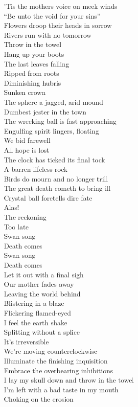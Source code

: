 'Tis the mothers voice on meek winds \\
``Be unto the void for your sins'' \\
Flowers droop their heads in sorrow \\
Rivers run with no tomorrow \\

Throw in the towel \\
Hang up your boots \\
The last leaves falling \\
Ripped from roots \\
Diminishing hubris \\
Sunken crown \\
The sphere a jagged, arid mound \\
Dumbest jester in the town \\
The wrecking ball is fast approaching \\
Engulfing spirit lingers, floating \\
We bid farewell \\
All hope is lost \\
The clock has ticked its final tock \\
A barren lifeless rock \\

Birds do mourn and no longer trill \\
The great death cometh to bring ill \\
Crystal ball foretells dire fate \\
Alas! \\
The reckoning \\
Too late \\

Swan song \\
Death comes \\
Swan song \\
Death comes \\

Let it out with a final sigh \\
Our mother fades away \\
Leaving the world behind \\
Blistering in a blaze \\
Flickering flamed-eyed \\
I feel the earth shake \\
Splitting without a splice \\
It's irreversible \\
We're moving counterclockwise \\
Illuminate the finishing inquisition \\
Embrace the overbearing inhibitions \\
I lay my skull down and throw in the towel \\
I'm left with a bad taste in my mouth \\
Choking on the  erosion \\

